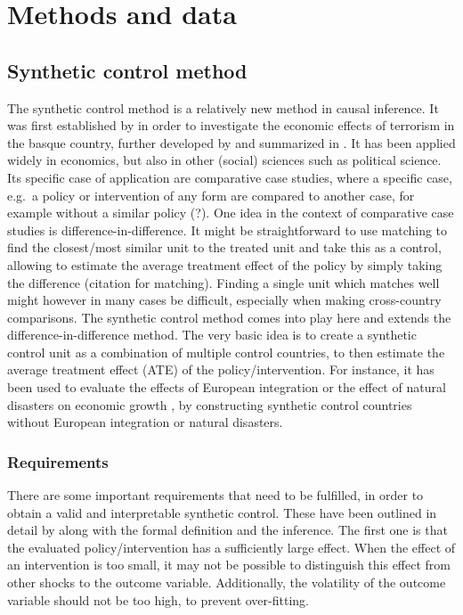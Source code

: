 \documentclass{scrbook}
\begin{document}
\chapter{Methods and data}

\section{Synthetic control method}

The synthetic control method is a relatively new method in causal
inference. It was first established by \textcite{abadie_economic_2003}
in order to investigate the economic effects of terrorism in the basque
country, further developed by \textcite{abadie_synthetic_2010} and
summarized in \textcite{abadie_using_2021}. It has been applied widely
in economics, but also in other (social) sciences such as political
science. Its specific case of application are comparative case studies,
where a specific case, e.g.~a policy or intervention of any form are
compared to another case, for example without a similar policy (?). One
idea in the context of comparative case studies is
difference-in-difference. It might be straightforward to use matching to
find the closest/most similar unit to the treated unit and take this as
a control, allowing to estimate the average treatment effect of the
policy by simply taking the difference (citation for matching). Finding
a single unit which matches well might however in many cases be
difficult, especially when making cross-country comparisons. The
synthetic control method comes into play here and extends the
difference-in-difference method. The very basic idea is to create a
synthetic control unit as a combination of multiple control countries,
to then estimate the average treatment effect (ATE) of the
policy/intervention. For instance, it has been used to evaluate the
effects of European integration \parencite{campos_institutional_2019} or
the effect of natural disasters on economic growth
\parencite{cavallo_catastrophic_2013}, by constructing synthetic control
countries without European integration or natural disasters.

\subsection*{Requirements}

There are some important requirements that need to be fulfilled, in
order to obtain a valid and interpretable synthetic control. These have
been outlined in detail by \textcite{abadie_using_2021} along with the
formal definition and the inference. The first one is that the evaluated
policy/intervention has a sufficiently large effect. When the effect of
an intervention is too small, it may not be possible to distinguish this
effect from other shocks to the outcome variable. Additionally, the
volatility of the outcome variable should not be too high, to prevent
over-fitting.
\end{document}
